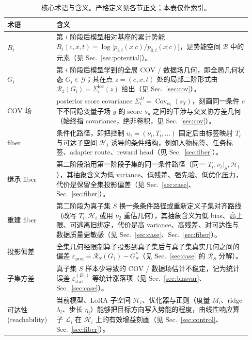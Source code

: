 \documentclass[11pt,a4paper]{article}
\DeclareMathOperator{\Cov}{Cov}
\newcommand{\cH}{\mathcal{H}}   %
\newcommand{\cL}{\mathcal{L}}   %
\newcommand{\cG}{\mathcal{G}}   %
\newcommand{\cB}{\mathcal{B}}   %
\newcommand{\Rstr}{\mathcal{R}}     %
\newcommand{\COV}{\mathrm{COV}}     %
\begin{document}
\begin{table}[htbp]
\centering
\caption{核心术语与含义。严格定义见各节正文；本表仅作索引。}
\label{tab:s14:glossary}
\begin{tabular}{@{}p{}p{}@{}}
\toprule
\textbf{术语} & \textbf{含义} \\
\midrule
$B_i$ &
第 $i$ 阶段后模型相对基座的累计势能 $B_i(c,x,t)=\log\!\big[p_{i,t}(x|c)/p_{0,t}(x|c)\big]$，是势能空间 $\cB$ 中的元素（见 Sec.~\ref{sec:potential}）。 \\
\addlinespace
$G_i$ &
第 $i$ 阶段后模型学到的全局 $\COV$ / 数据场几何，即全局几何状态 $G_i\in\cG$；其在点 $z=(c,x,t)$ 处的局部二阶形式由 $\Rstr_z(G_i)=\Sigma_i^{\mathrm{loc}}(z)$ 给出（见 Sec.~\ref{sec:cov}）。 \\
\addlinespace
$\COV$ 场 &
posterior score covariance $\Sigma_i^D=\Cov_{\alpha_i}(s_Y)$，刻画同一条件 $c$ 下不同隐变量子场 $y$ 的 score $s_y$ 之间的干涉与交叉协方差几何（始终指 covariance，绝非卷积，见 Sec.~\ref{sec:cov}）。 \\
\addlinespace
fiber &
条件化路径，即把控制 $u_i=(\nu_i,T_i,\dots)$ 固定后由标签映射 $T_i$ 与可达子空间 $\cH_i$ 诱导的条件结构，例如人物标签、任务标签、adapter route、reward head（见 Sec.~\ref{sec:fiber}）。 \\
\addlinespace
继承 fiber &
第二阶段沿用第一阶段子集的同一条件路径（同一 $T_i,\nu_i|_S,\cH_i$），其抽象含义为低 variance、低残差、强先验、低优化压力，代价是保留全集投影偏差（见 Sec.~\ref{sec:case}、Sec.~\ref{sec:fiber}）。 \\
\addlinespace
重建 fiber &
第二阶段为真子集 $S$ 换一条条件路径或重新定义子集对齐路线（改写 $T_i,\cH_i$ 或用 $\nu_2$ 重估几何），其抽象含义为低 bias、高上限、可逃离旧绑定，代价是高 variance、高残差、对可达性与数据质量更敏感（见 Sec.~\ref{sec:case}、Sec.~\ref{sec:fiber}）。 \\
\addlinespace
投影偏差 &
全集几何经限制算子投影到真子集后与真子集真实几何之间的偏差 $\varepsilon_{\mathrm{proj}}=\Rstr_S(G_1)-G_S^*$（见 Sec.~\ref{sec:case} 的 $\Rstr_S$ 分解）。 \\
\addlinespace
子集方差 &
真子集 $S$ 样本少导致的 $\COV$ / 数据场估计不稳定，记为统计误差 $\varepsilon_{\mathrm{stat}}^{(D_1)}$ 等统计涨落项（见 Sec.~\ref{sec:biasvar}、Sec.~\ref{sec:case}）。 \\
\addlinespace
可达性 (reachability) &
当前模型、LoRA 子空间 $\cH_i$、优化器与正则（度量 $M_i$、ridge $\lambda_i$、步长 $\eta_i$）能够把目标方向写入势能的程度，由线性响应算子 $\cL_i$ 在 $\cH_i$ 上的有效增益刻画（见 Sec.~\ref{sec:control}、Sec.~\ref{sec:fiber}）。 \\
\bottomrule
\end{tabular}
\end{table}
\end{document}
